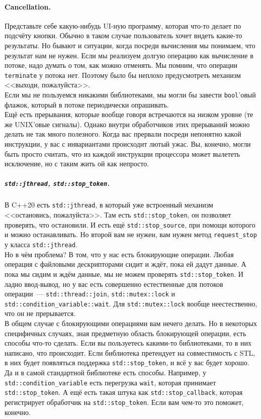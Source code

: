 \documentclass{article}
\begin{document}
    \paragraph{Cancellation.}
    Представьте себе какую-нибудь UI-ную программу, которая что-то делает по подсчёту кнопки. Обычно в таком случае пользователь хочет видеть какие-то результаты. Но бывают и ситуации, когда посреди вычисления мы понимаем, что результат нам не нужен. Если мы реализуем долгую операцию как вычисление в потоке, надо думать о том, как можно отменять. Мы помним, что операции \texttt{terminate} у потока нет. Поэтому было бы неплохо предусмотреть механизм <<выходи, пожалуйста>>.\\
    Если мы не пользуемся никакими библиотеками, мы могли бы завести \texttt{bool}'овый флажок, который в потоке периодически опрашивать.\\
    Ещё есть прерывания, которые вообще говоря встречаются на низком уровне (те же UNIX'овые сигналы). Однако внутри обработчиков этих прерываний можно делать не так много полезного. Когда вас прервали посреди непонятно какой инструкции, у вас с инвариантами происходит лютый ужас. Вы, конечно, могли быть просто считать, что из каждой инструкции процессора может вылететь исключение, но с таким жить ой как непросто.
    \subparagraph{\texttt{std::jthread}, \texttt{std::stop_token}.}
    В C++20 есть \texttt{std::jthread}, в который уже встроенный механизм <<остановись, пожалуйста>>. Там есть \texttt{std::stop_token}, он позволяет проверять, что остановили. И есть ещё \texttt{std::stop_source}, при помощи которого и можно останавливать. Но второй вам не нужен, вам нужен метод \texttt{request_stop} у класса \texttt{std::jthread}.\\
    Но в чём проблема? В том, что у нас есть блокирующие операции. Любая операция с файловыми дескрипторами сидит и ждёт, пока ей дадут данные. А пока мы сидим и ждём данные, мы не можем проверять \texttt{std::stop_token}. И ладно ввод-вывод, но у вас есть совершенно естественные для потоков операции~--- \texttt{std::thread::join}, \texttt{std::mutex::lock} и \texttt{std::condition_variable::wait}. Для \texttt{std::mutex::lock} вообще неестественно, что он не прерывается.\\
    В общем случае с блокирующими операциями вам нечего делать. Но в некоторых специфичных случаях, зная предметную область блокирующей операции, есть способы что-то сделать. Если вы пользуетесь какими-то библиотеками, то в них написано, что происходит. Если библиотека претендует на совместимость с STL, в них будет появляться поддержка \texttt{std::stop_token}, и всё у вас будет хорошо. Да и в самой стандартной библиотеке есть способы. Например, у \texttt{std::condition_variable} есть перегрузка \texttt{wait}, которая принимает \texttt{std::stop_token}. А ещё есть такая штука как \texttt{std::stop_callback}, которая регистрирует обработчик на \texttt{std::stop_token}. Если вам чем-то это поможет, конечно.
\end{document}
